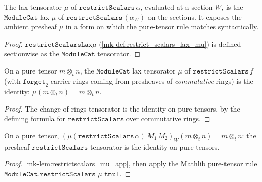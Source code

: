 \begin{lemma}\label{mk-lem:restrictscalars_mu_app}
  \leanok

  The lax tensorator \(\mu\) of \(\mathtt{restrictScalars}\,\alpha\), evaluated at a section
  \(W\), is the \(\mathtt{ModuleCat}\) lax \(\mu\) of \(\mathtt{restrictScalars}\,(\alpha_W)\)
  on the sections. It exposes the ambient presheaf \(\mu\) in a form on which the
  pure-tensor rule matches syntactically.
\end{lemma}
\begin{proof}
  \leanok
  \(\mathtt{restrictScalarsLax}\mu\) (\ref{mk-def:restrict_scalars_lax_mu}) is defined
  sectionwise as the \(\mathtt{ModuleCat}\) tensorator.
\end{proof}

\begin{lemma}\label{mk-lem:forget2_restrictscalars_mu_hom_tmul}
  \leanok

  On a pure tensor \(m \otimes_t n\), the \(\mathtt{ModuleCat}\) lax tensorator \(\mu\) of
  \(\mathtt{restrictScalars}\,f\) (with \(\mathtt{forget}_2\)-carrier rings coming from
  presheaves of \emph{commutative} rings) is the identity: \(\mu(m \otimes_t n) =
  m \otimes_t n\).
\end{lemma}
\begin{proof}
  \leanok


  The change-of-rings tensorator is the identity on pure tensors, by the
  defining formula for \(\mathtt{restrictScalars}\) over commutative rings.
\end{proof}

\begin{lemma}\label{mk-lem:restrictscalars_mu_app_tmul}
  \leanok

  On a pure tensor, \((\mu(\mathtt{restrictScalars}\,\alpha)\,M_1\,M_2)_W
  (m \otimes_t n) = m \otimes_t n\): the presheaf \(\mathtt{restrictScalars}\) tensorator is
  the identity on pure tensors.
\end{lemma}
\begin{proof}
  \leanok
  \ref{mk-lem:restrictscalars_mu_app}, then apply the Mathlib pure-tensor rule
  \(\mathtt{ModuleCat.restrictScalars\_}\mu\mathtt{\_tmul}\).
\end{proof}

